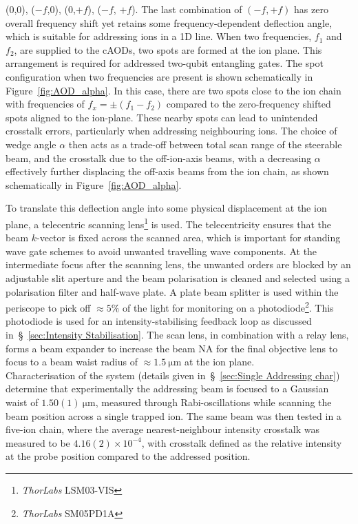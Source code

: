     (0,0), ($-f$,0), (0,$+f$), ($-f$, $+f$). The last combination of $(-f, +f)$
    has zero overall frequency shift yet retains some frequency-dependent
    deflection angle, which is suitable for addressing ions in a 1D line. When
    two frequencies, $f_1$ and $f_2$, are supplied to the cAODs, two spots are
    formed at the ion plane. This arrangement is required for addressed
    two-qubit entangling gates. The spot configuration when two frequencies are
    present is shown schematically in Figure~\ref{fig:AOD_alpha}. In this case,
    there are two spots close to the ion chain with frequencies of $f_x
    = \pm (f_1 - f_2)$ compared to the zero-frequency shifted spots aligned to the ion-plane. These nearby spots can lead to unintended crosstalk
    errors, particularly when addressing neighbouring ions.
    The choice of wedge angle $\alpha$ then acts as a trade-off between total
    scan range of the steerable beam, and the crosstalk due to the off-ion-axis
    beams, with a decreasing $\alpha$ effectively further
    displacing the off-axis beams from the ion chain, as shown schematically in Figure~\ref{fig:AOD_alpha}.

    To translate this deflection angle into some physical displacement at the ion
    plane, a telecentric scanning lens\footnote{\emph{ThorLabs} LSM03-VIS} is used. The
    telecentricity ensures that the beam $k$-vector is fixed across the
    scanned area, which is important for standing wave gate schemes to avoid
    unwanted travelling wave components. At the intermediate focus after the
    scanning lens, the unwanted orders are blocked by an adjustable slit
    aperture and the beam polarisation is cleaned and selected using a
    polarisation filter and half-wave plate. A plate beam
    splitter is used within the periscope to pick off $\approx
    5\%$ of the light for monitoring on a photodiode\footnote{\emph{ThorLabs} SM05PD1A}. This photodiode is
    used for an intensity-stabilising feedback loop as
    discussed in~\S~\ref{sec:Intensity Stabilisation}. The scan lens, in
    combination with a relay lens, forms a beam expander to increase the beam NA
    for the final objective lens to focus to a beam waist radius of $\approx
    1.5~\unit{\micro\meter}$ at the ion plane.\\

    Characterisation of the system (details given in~\S~\ref{sec:Single
    Addressing char}) determine that experimentally the addressing beam is
    focused to a Gaussian waist of $1.50(1)~\unit{\micro\meter}$, measured
    through Rabi-oscillations while scanning the beam position across a single
    trapped ion. The same beam was then tested in a five-ion chain, where the
    average nearest-neighbour intensity crosstalk was measured to be $4.16(2)\times
    10^{-4}$, with crosstalk defined as the relative intensity at the probe
    position compared to the addressed position. 

